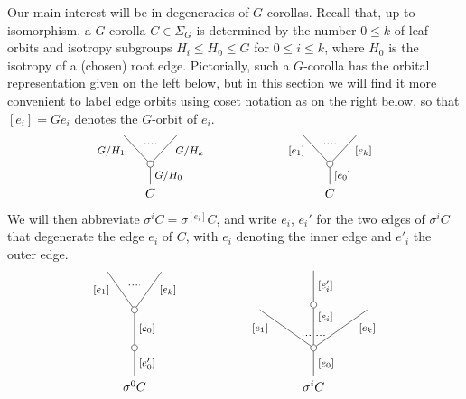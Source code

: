 \documentclass[a4paper,10pt]{article}%
\numberwithin{equation}{section}
\numberwithin{figure}{section}
\theoremstyle{definition} %
\newcommand{\1}{\ensuremath{\mathbbm 1}}%
\begin{document}
Our main interest will be in degeneracies of $G$-corollas. Recall that, up to isomorphism, 
a $G$-corolla $C \in \Sigma_G$ is determined by the number $0 \leq k$ of leaf orbits
and isotropy subgroups
$H_i \leq H_0 \leq G$ for $0 \leq i \leq k$,
where $H_0$ is the isotropy of a (chosen) root edge.
Pictorially, such a $G$-corolla has the orbital representation given on the left below,
but in this section we will find it more convenient to label edge orbits using coset notation as on the right below,
so that $[e_i] = G e_i$ denotes the $G$-orbit of $e_i$.
\[
\begin{tikzpicture}
[grow=up,auto,level distance=2.3em,every node/.style = {font=\footnotesize},dummy/.style={circle,draw,inner sep=0pt,minimum size=1.75mm}]
	\node at (0,0) [font=\normalsize]{$C$}
		child{node [dummy] {}
			child{
			edge from parent node [swap,near end] {$G/H_k$} node [name=Kn] {}}
			child{
			edge from parent node [near end] {$G/H_1$}
node [name=Kone,swap] {}}
		edge from parent node [swap] {$G/H_0$}
		};
		\draw [dotted,thick] (Kone) -- (Kn) ;
	\node at (5,0) [font=\normalsize]{$C$}
		child{node [dummy] {}
			child{
			edge from parent node [swap,near end] {$[e_k]$} node [name=Kn] {}}
			child{
			edge from parent node [near end] {$[e_1]$}
node [name=Kone,swap] {}}
		edge from parent node [swap] {$[e_0]$}
		};
		\draw [dotted,thick] (Kone) -- (Kn) ;
\end{tikzpicture}
\]
We will then abbreviate $\sigma^i C = \sigma^{[e_i]} C$, and write $e_i$, $e_i'$ for the two edges of $\sigma^i C $ that degenerate the edge $e_i$ of $C$,
with $e_i$ denoting the inner edge and $e'_i$ the outer
edge.
\[
\begin{tikzpicture}
[grow=up,auto,level distance=3em,
every node/.style = {font=\footnotesize},
dummy/.style={circle,draw,inner sep=0pt,minimum size=1.75mm}]
	\node at (0,0) [font=\normalsize]{$\sigma^0 C$}
		child{node [dummy] {}
			child{node [dummy] {}
				child{
				edge from parent node [swap,near end] {$[e_k]$} node [name=Kn] {}}
				child{
				edge from parent node [near end] {$[e_1]$}
node [name=Kone,swap] {}}
			edge from parent node [swap] {$[e_0]$}}
		edge from parent node [swap] {$[e'_0]$}
		};
		\draw [dotted,thick] (Kone) -- (Kn) ;
	\node at (5,0) [font=\normalsize]{$\sigma^i C$}
		child{node [dummy] {}
			child{
			edge from parent node [swap,near end] {$[e_k]$} node [near start,inner sep=1pt,name=Kn] {}}
			child[level distance=3.4em]{node [dummy] {}
				child[level distance=2.7em]{
				edge from parent node [swap] {$[e'_i]$}
}
			edge from parent node [near end,swap] {$[e_i]$}
node [near start,inner sep=1pt,name=Kone,swap] {}
node [near start,inner sep=1pt,name=Kone1] {}}
			child{
			edge from parent node [near end] {$[e_1]$}
node [swap] {}
node [near start,inner sep=1pt,name=Kn1,swap]{}}
		edge from parent node [swap] {$[e_0]$}
		};
		\draw [dotted,thick] (Kone) -- (Kn) ;
		\draw [dotted,thick] (Kone1) -- (Kn1) ;
\end{tikzpicture}
\]
\end{document}
